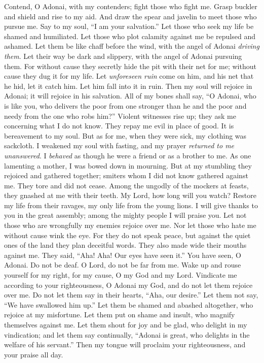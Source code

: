 \begin{biblechapter} %
 Contend, O Adonai, with my contenders; 
fight those who fight me.
\verse Grasp buckler and shield 
and rise to my aid.
\verse And draw the spear and javelin to meet those who pursue me. 
Say to my soul, “I am your salvation.”
\verse Let those who seek my life be shamed and humiliated. 
Let those who plot calamity against me be repulsed and ashamed.
\verse Let them be like chaff before the wind, 
with the angel of Adonai \textit{driving them}.
\verse Let their way be dark and slippery, 
with the angel of Adonai pursuing them.
\verse For without cause they secretly hide the pit with their net for me; 
without cause they dug it for my life.
\verse Let \textit{unforeseen ruin} come on him, 
and his net that he hid, let it catch him. 
Let him fall into it in ruin.
\verse Then my soul will rejoice in Adonai; 
it will rejoice in his salvation.
\verse All of my bones shall say, “O Adonai, who is like you, 
who delivers the poor from one stronger than he 
and the poor and needy from the one who robs him?”
\verse Violent witnesses rise up; 
they ask me concerning what I do not know.
\verse They repay me evil in place of good. 
It is bereavement to my soul.
\verse But as for me, when they were sick, my clothing was sackcloth. 
I weakened my soul with fasting, 
and my prayer \textit{returned to me unanswered}.
\verse I \textit{behaved} as though he were a friend or as a brother to me. 
As one lamenting a mother, I was bowed down in mourning.
\verse But at my stumbling they rejoiced and gathered together; 
smiters whom I did not know gathered against me. 
They tore and did not cease.
\verse Among the ungodly of the mockers at feasts, 
they gnashed at me with their teeth.
\verse My Lord, how long will you watch? 
Restore my life from their ravages, 
my only life from the young lions.
\verse I will give thanks to you in the great assembly; 
among the mighty people I will praise you.
\verse Let not those who are wrongfully my enemies rejoice over me. 
Nor let those who hate me without cause wink the eye.
\verse For they do not speak peace, 
but against the quiet ones of the land 
they plan deceitful words.
\verse They also made wide their mouths against me. 
They said, “Aha! Aha! 
Our eyes have seen it.”
\verse You have seen, O Adonai. Do not be deaf. 
O Lord, do not be far from me.
\verse Wake up and rouse yourself for my right, 
for my cause, O my God and my Lord.
\verse Vindicate me according to your righteousness, 
O Adonai my God, 
and do not let them rejoice over me.
\verse Do not let them say in their hearts, “Aha, our desire.” 
Let them not say, “We have swallowed him up.”
\verse Let them be shamed and abashed altogether, 
who rejoice at my misfortune. 
Let them put on shame and insult, 
who magnify themselves against me.
\verse Let them shout for joy and be glad, 
who delight in my vindication; 
and let them say continually, “Adonai is great, 
who delights in the welfare of his servant.”
\verse Then my tongue will proclaim your righteousness, 
and your praise all day.
\end{biblechapter}


